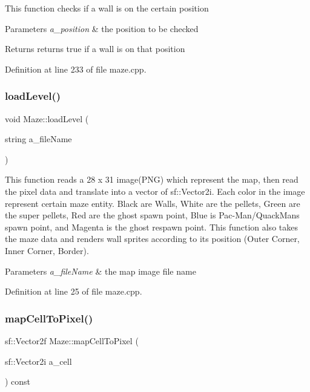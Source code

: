 This function checks if a wall is on the certain position


\begin{DoxyParams}{Parameters}
{\em a\+\_\+position} & the position to be checked \\
\hline
\end{DoxyParams}
\begin{DoxyReturn}{Returns}
returns true if a wall is on that position 
\end{DoxyReturn}


Definition at line 233 of file maze.\+cpp.

\mbox{\label{class_maze_a130c9d8858022b05b083a3f0c630fbaf}} 
\subsubsection{\texorpdfstring{load\+Level()}{loadLevel()}}
{\footnotesize\ttfamily void Maze\+::load\+Level (\begin{DoxyParamCaption}\item[{string}]{a\+\_\+file\+Name }\end{DoxyParamCaption})}

This function reads a 28 x 31 image(\+P\+N\+G) which represent the map, then read the pixel data and translate into a vector of sf\+::\+Vector2i. Each color in the image represent certain maze entity. Black are Walls, White are the pellets, Green are the super pellets, Red are the ghost spawn point, Blue is Pac-\/\+Man/\+Quack\+Man\textquotesingle{}s spawn point, and Magenta is the ghost respawn point. This function also takes the maze data and renders wall sprites according to its position (Outer Corner, Inner Corner, Border). 
\begin{DoxyParams}{Parameters}
{\em a\+\_\+file\+Name} & the map image file name \\
\hline
\end{DoxyParams}


Definition at line 25 of file maze.\+cpp.

\mbox{\label{class_maze_ad1ed938797ff928c0b90cf176d298429}} 
\subsubsection{\texorpdfstring{map\+Cell\+To\+Pixel()}{mapCellToPixel()}}
{\footnotesize\ttfamily sf\+::\+Vector2f Maze\+::map\+Cell\+To\+Pixel (\begin{DoxyParamCaption}\item[{sf\+::\+Vector2i}]{a\+\_\+cell }\end{DoxyParamCaption}) const}

